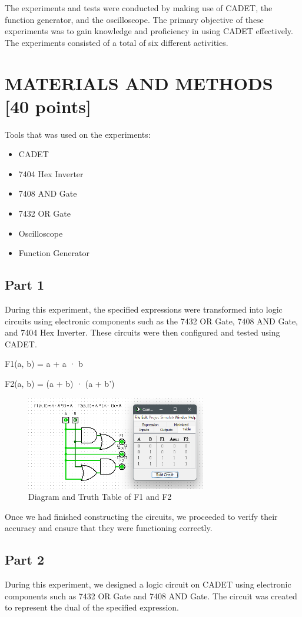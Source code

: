 \documentclass[pdftex,12pt,a4paper]{article}
\begin{document}
The experiments and tests were conducted by making use of CADET, the function generator, and the oscilloscope. The primary objective of these experiments was to gain knowledge and proficiency in using CADET effectively. The experiments consisted of a total of six different activities.

\section{MATERIALS AND METHODS [40 points]}
Tools that was used on the experiments:
\begin{itemize}
    \item CADET
    \item 7404 Hex Inverter
    \item 7408 AND Gate
    \item 7432 OR Gate
    \item Oscilloscope
    \item Function Generator
\end{itemize}

\subsection{Part 1}
During this experiment, the specified expressions were transformed into logic circuits using electronic components such as the 7432 OR Gate, 7408 AND Gate, and 7404 Hex Inverter. These circuits were then configured and tested using CADET.

F1(a, b) = a + a · b

F2(a, b) = (a + b) · (a + b')
\begin{figure}[H]
	\centering
	\includegraphics[width=0.7\textwidth]{ex1.png}	
	\caption{Diagram and Truth Table of F1 and F2}
	\label{fig1}
\end{figure}


Once we had finished constructing the circuits, we proceeded to verify their accuracy and ensure that they were functioning correctly.
\subsection{Part 2}
During this experiment, we designed a logic circuit on CADET using electronic components such as 7432 OR Gate and 7408 AND Gate. The circuit was created to represent the dual of the specified expression.
\end{document}
